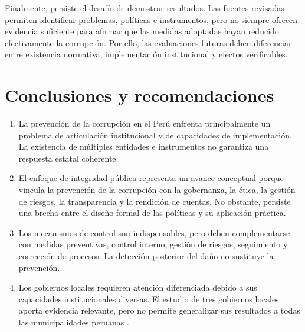 \documentclass[Afour,sageh,times]{sagej}
\newcommand{\relleno}[1]{\textcolor{red}{[#1]}}
\begin{document}
Finalmente, persiste el desafío de demostrar resultados. Las fuentes revisadas permiten identificar problemas, políticas e instrumentos, pero no siempre ofrecen evidencia suficiente para afirmar que las medidas adoptadas hayan reducido efectivamente la corrupción. Por ello, las evaluaciones futuras deben diferenciar entre existencia normativa, implementación institucional y efectos verificables.


\section{Conclusiones y recomendaciones}
\label{sec:conclusiones-recomendaciones}

\begin{enumerate}
\item La prevención de la corrupción en el Perú enfrenta principalmente un problema de articulación institucional y de capacidades de implementación. La existencia de múltiples entidades e instrumentos no garantiza una respuesta estatal coherente.

\item El enfoque de integridad pública representa un avance conceptual porque vincula la prevención de la corrupción con la gobernanza, la ética, la gestión de riesgos, la transparencia y la rendición de cuentas. No obstante, persiste una brecha entre el diseño formal de las políticas y su aplicación práctica.

\item Los mecanismos de control son indispensables, pero deben complementarse con medidas preventivas, control interno, gestión de riesgos, seguimiento y corrección de procesos. La detección posterior del daño no sustituye la prevención.

\item Los gobiernos locales requieren atención diferenciada debido a sus capacidades institucionales diversas. El estudio de tres gobiernos locales aporta evidencia relevante, pero no permite generalizar sus resultados a todas las municipalidades peruanas \citep{integridadmunicipal2025}.
\end{enumerate}
\end{document}
